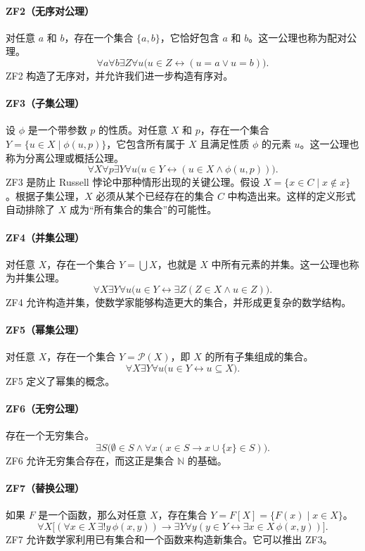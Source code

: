 \paragraph{ZF2（无序对公理）}
对任意 $a$ 和 $b$，存在一个集合 $\{a,b\}$，它恰好包含 $a$ 和 $b$。这一公理也称为配对公理。
\[
\forall a\forall b\exists Z\forall u\bigl(u\in Z\leftrightarrow (u=a\vee u=b)\bigr).
\]
ZF2 构造了无序对，并允许我们进一步构造有序对。

\paragraph{ZF3（子集公理）}
设 $\phi$ 是一个带参数 $p$ 的性质。对任意 $X$ 和 $p$，存在一个集合
$Y=\{u\in X\mid \phi(u,p)\}$，它包含所有属于 $X$ 且满足性质 $\phi$ 的元素 $u$。这一公理也称为分离公理或概括公理。
\[
\forall X\forall p\exists Y\forall u\bigl(u\in Y\leftrightarrow (u\in X\wedge \phi(u,p))\bigr).
\]
ZF3 是防止 Russell 悖论中那种情形出现的关键公理。假设
$X=\{x\in C\mid x\notin x\}$。根据子集公理，$X$ 必须从某个已经存在的集合 $C$ 中构造出来。这样的定义形式自动排除了 $X$ 成为“所有集合的集合”的可能性。

\paragraph{ZF4（并集公理）}
对任意 $X$，存在一个集合 $Y=\bigcup X$，也就是 $X$ 中所有元素的并集。这一公理也称为并集公理。
\[
\forall X\exists Y\forall u\bigl(u\in Y\leftrightarrow \exists Z(Z\in X\wedge u\in Z)\bigr).
\]
ZF4 允许构造并集，使数学家能够构造更大的集合，并形成更复杂的数学结构。

\paragraph{ZF5（幂集公理）}
对任意 $X$，存在一个集合 $Y=\mathcal{P}(X)$，即 $X$ 的所有子集组成的集合。
\[
\forall X\exists Y\forall u\bigl(u\in Y\leftrightarrow u\subseteq X\bigr).
\]
ZF5 定义了幂集的概念。

\paragraph{ZF6（无穷公理）}
存在一个无穷集合。
\[
\exists S\bigl(\emptyset\in S\wedge \forall x(x\in S\to x\cup\{x\}\in S)\bigr).
\]
ZF6 允许无穷集合存在，而这正是集合 $\mathbb{N}$ 的基础。

\paragraph{ZF7（替换公理）}
如果 $F$ 是一个函数，那么对任意 $X$，存在集合
$Y=F[X]=\{F(x)\mid x\in X\}$。
\[
\forall X\bigl[(\forall x\in X\,\exists!y\,\phi(x,y))\to \exists Y\forall y(y\in Y\leftrightarrow \exists x\in X\,\phi(x,y))\bigr].
\]
ZF7 允许数学家利用已有集合和一个函数来构造新集合。它可以推出 ZF3。

